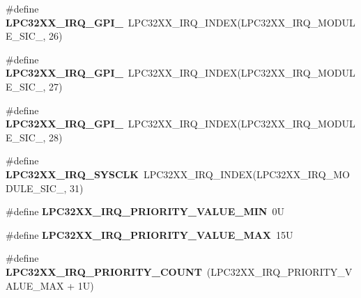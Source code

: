 \begin{DoxyCompactItemize}
\#define {\bfseries L\+P\+C32\+X\+X\+\_\+\+I\+R\+Q\+\_\+\+G\+P\+I\+\_}~L\+P\+C32\+X\+X\+\_\+\+I\+R\+Q\+\_\+\+I\+N\+D\+EX(L\+P\+C32\+X\+X\+\_\+\+I\+R\+Q\+\_\+\+M\+O\+D\+U\+L\+E\+\_\+\+S\+I\+C\+\_, 26)
\item 
\mbox{\label{group__lpc32xx__interrupt_ga06f87ea92ff0eec133a242a2539df5a3}} 
\#define {\bfseries L\+P\+C32\+X\+X\+\_\+\+I\+R\+Q\+\_\+\+G\+P\+I\+\_}~L\+P\+C32\+X\+X\+\_\+\+I\+R\+Q\+\_\+\+I\+N\+D\+EX(L\+P\+C32\+X\+X\+\_\+\+I\+R\+Q\+\_\+\+M\+O\+D\+U\+L\+E\+\_\+\+S\+I\+C\+\_, 27)
\item 
\mbox{\label{group__lpc32xx__interrupt_gab2950d8fcb88427e10178008e663a8fc}} 
\#define {\bfseries L\+P\+C32\+X\+X\+\_\+\+I\+R\+Q\+\_\+\+G\+P\+I\+\_}~L\+P\+C32\+X\+X\+\_\+\+I\+R\+Q\+\_\+\+I\+N\+D\+EX(L\+P\+C32\+X\+X\+\_\+\+I\+R\+Q\+\_\+\+M\+O\+D\+U\+L\+E\+\_\+\+S\+I\+C\+\_, 28)
\item 
\mbox{\label{group__lpc32xx__interrupt_ga8ad5776e4050f120dd4be5c17e130e68}} 
\#define {\bfseries L\+P\+C32\+X\+X\+\_\+\+I\+R\+Q\+\_\+\+S\+Y\+S\+C\+LK}~L\+P\+C32\+X\+X\+\_\+\+I\+R\+Q\+\_\+\+I\+N\+D\+EX(L\+P\+C32\+X\+X\+\_\+\+I\+R\+Q\+\_\+\+M\+O\+D\+U\+L\+E\+\_\+\+S\+I\+C\+\_, 31)
\item 
\mbox{\label{group__lpc32xx__interrupt_ga05665d9babe2457d1ad928637f188c93}} 
\#define {\bfseries L\+P\+C32\+X\+X\+\_\+\+I\+R\+Q\+\_\+\+P\+R\+I\+O\+R\+I\+T\+Y\+\_\+\+V\+A\+L\+U\+E\+\_\+\+M\+IN}~0U
\item 
\mbox{\label{group__lpc32xx__interrupt_ga70cca1f64945d64447eca2d9ea2960c9}} 
\#define {\bfseries L\+P\+C32\+X\+X\+\_\+\+I\+R\+Q\+\_\+\+P\+R\+I\+O\+R\+I\+T\+Y\+\_\+\+V\+A\+L\+U\+E\+\_\+\+M\+AX}~15U
\item 
\mbox{\label{group__lpc32xx__interrupt_ga74ef4771227c69c69dc10ee9a3cfa294}} 
\#define {\bfseries L\+P\+C32\+X\+X\+\_\+\+I\+R\+Q\+\_\+\+P\+R\+I\+O\+R\+I\+T\+Y\+\_\+\+C\+O\+U\+NT}~(L\+P\+C32\+X\+X\+\_\+\+I\+R\+Q\+\_\+\+P\+R\+I\+O\+R\+I\+T\+Y\+\_\+\+V\+A\+L\+U\+E\+\_\+\+M\+AX + 1\+U)
\item 
\mbox{\label{group__lpc32xx__interrupt_ga14f2e633505e3267eec7f6524fd012bd}} 

\end{DoxyCompactItemize}
